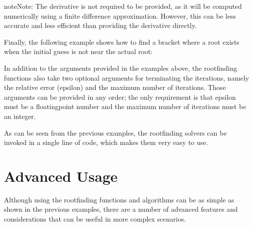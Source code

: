 \documentclass[letterpaper,10pt,english]{sphinxmanual}
\begin{document}
\begin{sphinxadmonition}{note}{Note:}
\sphinxAtStartPar
The derivative is not required to be provided, as it will be computed numerically using a finite difference approximation. However, this can be less accurate and less efficient than providing the derivative directly.
\end{sphinxadmonition}

\sphinxAtStartPar
Finally, the following example shows how to find a bracket where a root exists when the initial guess is not near the actual root:

\begin{sphinxVerbatim}[commandchars=\\\{\}]
\PYG{p}{[}\PYG{p}{]}
\end{sphinxVerbatim}

\sphinxAtStartPar
In addition to the arguments provided in the examples above, the root\sphinxhyphen{}finding functions also take two optional arguments for terminating the iterations, namely the relative error (epsilon) and the maximum number of iterations. Those arguments can be provided in any order; the only requirement is that epsilon must be a floating\sphinxhyphen{}point number and the maximum number of iterations must be an integer.

\sphinxAtStartPar
As can be seen from the previous examples, the root\sphinxhyphen{}finding solvers can be invoked in a single line of code, which makes them very easy to use.


\section{Advanced Usage}
\label{\detokenize{docRoots:advanced-usage}}
\sphinxAtStartPar
Although using the root\sphinxhyphen{}finding functions and algorithms can be as simple as shown in the previous examples, there are a number of advanced features and considerations that can be useful in more complex scenarios.
\end{document}
